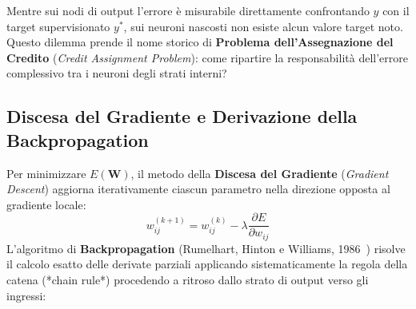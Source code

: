 Mentre sui nodi di output l'errore è misurabile direttamente confrontando $y$ con il target supervisionato $y^*$, sui neuroni nascosti non esiste alcun valore target noto. Questo dilemma prende il nome storico di \textbf{Problema dell'Assegnazione del Credito} (\textit{Credit Assignment Problem}): come ripartire la responsabilità dell'errore complessivo tra i neuroni degli strati interni?

\FloatBarrier
\subsection{Discesa del Gradiente e Derivazione della Backpropagation}
\label{subsec:dm-gradient-descent-chain-rule}

Per minimizzare $E(\mathbf{W})$, il metodo della \textbf{Discesa del Gradiente} (\textit{Gradient Descent}) aggiorna iterativamente ciascun parametro nella direzione opposta al gradiente locale:
\begin{equation}
    w_{ij}^{(k+1)} = w_{ij}^{(k)} - \lambda \frac{\partial E}{\partial w_{ij}}
\end{equation}
L'algoritmo di \textbf{Backpropagation} (Rumelhart, Hinton e Williams, 1986~\cite{rumelhart1986}) risolve il calcolo esatto delle derivate parziali applicando sistematicamente la regola della catena (*chain rule*) procedendo a ritroso dallo strato di output verso gli ingressi:

